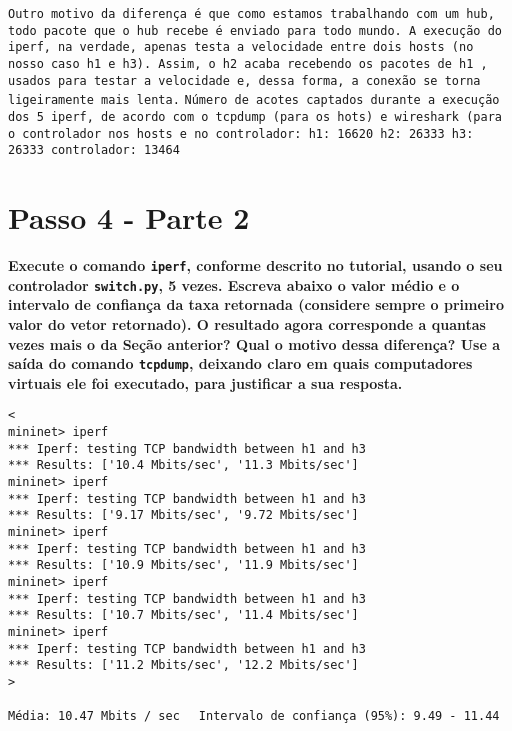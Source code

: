 \documentclass[12pt,letterpaper]{article}
\begin{document}
\texttt{Outro motivo da diferença é que como estamos trabalhando com um hub, todo pacote que o hub recebe é enviado para todo mundo. A execução do iperf, na verdade, apenas testa a velocidade entre dois hosts (no nosso caso h1 e h3). Assim, o h2 acaba recebendo os pacotes de h1 , usados para testar a velocidade e, dessa forma, a conexão se torna ligeiramente mais lenta.}
\newline \newline
\texttt{Número de acotes captados durante a execução dos 5 iperf, de acordo com o tcpdump (para os hots) e wireshark (para o controlador nos hosts e no controlador: \newline
h1: 16620 \newline
h2: 26333 \newline
h3: 26333 \newline
controlador: 13464 \newline }

 

\section{Passo 4 - Parte 2}

\textbf{Execute o comando \texttt{iperf}, conforme descrito no
tutorial, usando o seu controlador \texttt{switch.py}, 5 vezes.
Escreva abaixo o valor médio e o intervalo de confiança da taxa
retornada (considere sempre o primeiro valor do vetor retornado). O
resultado agora corresponde a quantas vezes mais o da Seção anterior?
Qual o motivo dessa diferença? Use a saída do comando
\texttt{tcpdump}, deixando claro em quais computadores virtuais ele
foi executado, para justificar a sua resposta.}

\begin{verbatim}
<
mininet> iperf
*** Iperf: testing TCP bandwidth between h1 and h3
*** Results: ['10.4 Mbits/sec', '11.3 Mbits/sec']
mininet> iperf
*** Iperf: testing TCP bandwidth between h1 and h3
*** Results: ['9.17 Mbits/sec', '9.72 Mbits/sec']
mininet> iperf
*** Iperf: testing TCP bandwidth between h1 and h3
*** Results: ['10.9 Mbits/sec', '11.9 Mbits/sec']
mininet> iperf
*** Iperf: testing TCP bandwidth between h1 and h3
*** Results: ['10.7 Mbits/sec', '11.4 Mbits/sec']
mininet> iperf
*** Iperf: testing TCP bandwidth between h1 and h3
*** Results: ['11.2 Mbits/sec', '12.2 Mbits/sec']
>
\end{verbatim}

\texttt{Média: 10.47 Mbits / sec } \newline
\texttt{ Intervalo de confiança (95\%): 9.49 - 11.44}
\newline
\newline
\end{document}
